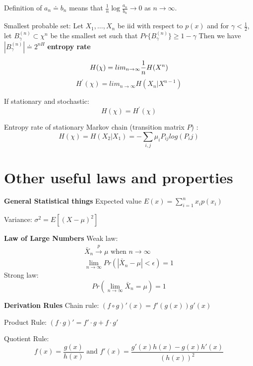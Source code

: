 \documentclass[10pt]{article}
\begin{document}
\begin{tiny}
\begin{multicols}{3}
Definition of $a_n \doteq b_n$ means that $\frac{1}{n}\log \frac{a_n}{b_n} \rightarrow 0$ as $n\rightarrow \infty$.

Smallest probable set: Let $X_1,\ldots, X_n$ be iid with respect to $p(x)$ and for $\gamma < \frac{1}{2}$, let $B_\gamma^{(n)} \subset \chi^n$ be the smallest set such that $Pr\{ B_\gamma^{(n)} \} \geq 1-\gamma $ Then we have $|B_\gamma^{(n)}| \doteq 2^{nH}$
\textbf{entropy rate}

\begin{equation}
H(\chi) = lim_{n \to \infty} \frac{1}{n} H(X^n) \\
\end{equation}
\begin{equation}
H^\prime(\chi) = lim_{n \to \infty} H(X_n | X^{n-1})
\end{equation}

\noindent If stationary and stochastic:
\begin{equation}
H(\chi) = H^\prime(\chi)
\end{equation}

\noindent Entropy rate of stationary Markov chain (transition matrix $P$) :
\begin{equation}
H(\chi) = H(X_2|X_1) = -\sum_{i,j} \mu_i P_{ij}log(P_ij)
\end{equation}

\section*{Other useful laws and properties}
{\bf General Statistical things} Expected value $E(x)=\sum_{i=1}^n x_i p(x_i)$

Variance: $\sigma^2 = E\left[ \left(X-\mu\right)^2\right]$

{\bf Law of Large Numbers} Weak law:
\begin{eqnarray*}
\bar{X}_n\overset{p}\rightarrow \mu \text{ when } n \rightarrow \infty\\
\lim_{n\rightarrow \infty} Pr\left(|\bar{X}_n-\mu| < \epsilon \right) = 1
\end{eqnarray*}
Strong law:
\begin{equation}
Pr\left(\lim_{n\rightarrow \infty} \bar{X}_n = \mu \right) = 1
\end{equation}

{\bf Derivation Rules} Chain rule: $(f \circ g)'(x)=f'(g(x))g'(x)$

Product Rule: $(f\cdot g)' = f' \cdot g + f \cdot g'$

Quotient Rule: \[f(x)=\frac{g(x)}{h(x)}\text{ and }f'(x)=\frac{g'(x)h(x)-g(x)h'(x)}{\left(h(x)\right)^2}\]



\end{multicols}
\end{tiny}
\end{document}
